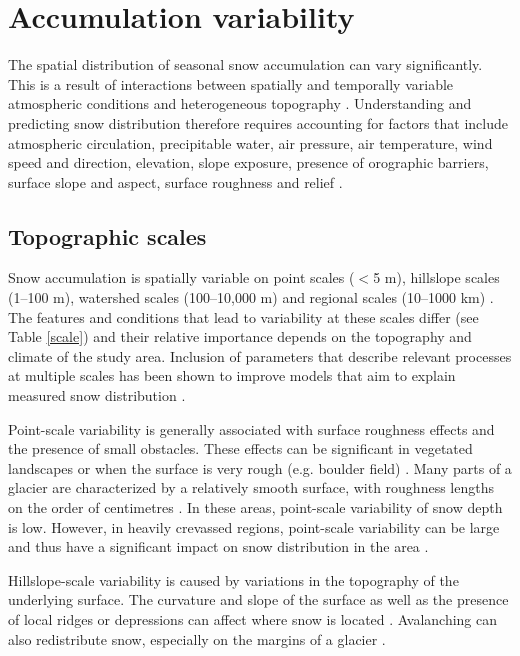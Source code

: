 \documentclass{sfuthesis}
\begin{document}
\section{Accumulation variability}
\label{sec:accumvariabilityintro}

The spatial distribution of seasonal snow accumulation can vary significantly. This is a result of interactions between spatially and temporally variable atmospheric conditions and heterogeneous topography \citep{Deems2006, Liston2006}. Understanding and predicting snow distribution therefore requires accounting for factors that include atmospheric circulation, precipitable water, air pressure, air temperature, wind speed and direction, elevation, slope exposure, presence of orographic barriers, surface slope and aspect, surface roughness and relief \citep{Schweizer2008a,McGrath2015}.

\subsection{Topographic scales}
Snow accumulation is spatially variable on point scales ($<$5 m), hillslope scales (1--100 m), watershed scales (100--10,000 m) and regional scales (10--1000 km) \citep{Clark2011}. The features and conditions that lead to variability at these scales differ (see Table \ref{scale}) and their relative importance depends on the topography and climate of the study area. Inclusion of parameters that describe relevant processes at multiple scales has been shown to improve models that aim to explain measured snow distribution \citep{Marchand2005, Clark2011}. 

Point-scale variability is generally associated with surface roughness effects and the presence of small obstacles. These effects can be significant in vegetated landscapes or when the surface is very rough (e.g. boulder field) \citep{Lopez2011}. Many parts of a glacier are characterized by a relatively smooth surface, with roughness lengths on the order of centimetres \citep{Hock2005}. In these areas, point-scale variability of snow depth is low. However, in heavily crevassed regions, point-scale variability can be large and thus have a significant impact on snow distribution in the area \citep{McGrath2015}. 

Hillslope-scale variability is caused by variations in the topography of the underlying surface. The curvature and slope of the surface as well as the presence of local ridges or depressions can affect where snow is located \citep{Bloeschl1999, Sold2013}. Avalanching can also redistribute snow, especially on the margins of a glacier \citep{Bloschl1991, Mott2008}. 
\end{document}
